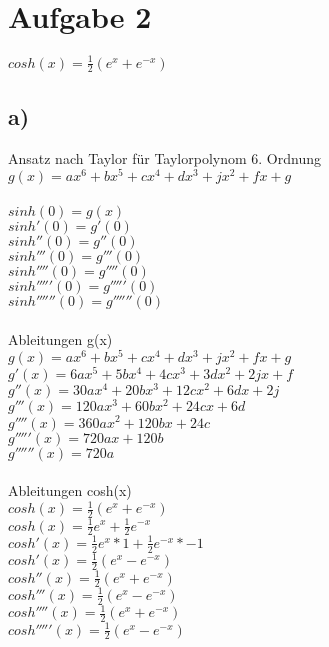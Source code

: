 \documentclass{article}
\begin{document}
	\section*{Aufgabe 2}
	$cosh(x) = \frac{1}{2}(e^x + e^{-x})$ \\
	
	\subsection*{a)}
	Ansatz nach Taylor für Taylorpolynom 6. Ordnung \\
	$g(x) = ax^6 + bx^5 + cx^4 + dx^3 + jx^2 + fx + g$ \\ \\
	$sinh(0) = g(x)$ \\
	$sinh'(0) = g'(0)$ \\
	$sinh''(0) = g''(0)$ \\
	$sinh'''(0) = g'''(0)$ \\
	$sinh''''(0) = g''''(0)$ \\
	$sinh'''''(0) = g'''''(0)$ \\
	$sinh''''''(0) = g''''''(0)$ \\	\\
	Ableitungen g(x) \\
	$g(x) = ax^6 + bx^5 + cx^4 + dx^3 + jx^2 + fx + g$ \\
	$g'(x) = 6ax^5 + 5bx^4 + 4cx^3 + 3dx^2 + 2jx + f$ \\
	$g''(x) = 30ax^4 + 20bx^3 + 12cx^2 + 6dx + 2j$ \\
	$g'''(x) = 120ax^3 + 60bx^2 + 24cx + 6d$ \\
	$g''''(x) = 360ax^2 + 120bx + 24c$ \\
	$g'''''(x) = 720ax + 120b$ \\
	$g''''''(x) = 720a$ \\ \\
	Ableitungen cosh(x) \\
	$cosh(x) = \frac{1}{2}(e^x + e^{-x})$ \\
	$cosh(x) = \frac{1}{2}e^x + \frac{1}{2}e^{-x}$ \\
	$cosh'(x) = \frac{1}{2}e^x*1 + \frac{1}{2}e^{-x}*-1$ \\
	$cosh'(x) = \frac{1}{2}(e^x - e^{-x})$ \\
	$cosh''(x) = \frac{1}{2}(e^x + e^{-x})$ \\
	$cosh'''(x) = \frac{1}{2}(e^x - e^{-x})$ \\
	$cosh''''(x) = \frac{1}{2}(e^x + e^{-x})$ \\
	$cosh'''''(x) = \frac{1}{2}(e^x - e^{-x})$ \\
\end{document}
